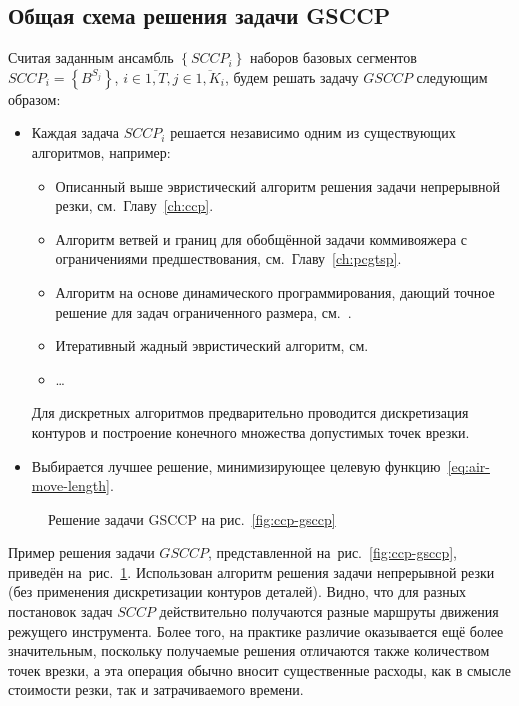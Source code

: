 \subsection{Общая схема решения задачи GSCCP}

Считая заданным ансамбль
$\left\{ SCCP_i \right\}$
наборов базовых сегментов
$SCCP_i = \left\{B^{S_j}\right\}$,
$
i \in \overline{1, T},
j \in \overline{1, K_i}
$,
будем решать задачу $GSCCP$
следующим образом:

\begin{itemize}
  \item
  Каждая задача
  $SCCP_i$
  решается независимо одним из существующих алгоритмов, например:
  \begin{itemize}
    \item
    Описанный выше эвристический алгоритм решения задачи непрерывной резки,
    см.~Главу~\ref{ch:ccp}.
    \item
    Алгоритм ветвей и границ для обобщённой задачи коммивояжера
    с ограничениями предшествования,
    см.~Главу~\ref{ch:pcgtsp}.
    \item
    Алгоритм на основе динамического программирования,
    дающий точное решение для задач ограниченного размера,
    см.~\cite{bi:RoMa}.
    \item
    Итеративный жадный эвристический алгоритм,
    см.~\cite{bi:greedy}
    \item \dots
  \end{itemize}
  Для дискретных алгоритмов предварительно проводится
  дискретизация контуров и построение конечного
  множества допустимых точек врезки.
  \item
  Выбирается лучшее решение,
  минимизирующее целевую функцию~\eqref{eq:air-move-length}.
\end{itemize}

\begin{figure}
  \centering
  \caption{Решение задачи GSCCP на рис.~\ref{fig:ccp-gsccp}}
  \label{fig:ccp-gsccp-solution}
\end{figure}

Пример решения задачи $GSCCP$,
представленной на~рис.~\ref{fig:ccp-gsccp},
приведён на~рис.~\ref{fig:ccp-gsccp-solution}.
Использован алгоритм решения задачи непрерывной резки
(без применения дискретизации контуров деталей).
Видно, что для разных постановок задач $SCCP$
действительно получаются разные маршруты
движения режущего инструмента.
Более того,
на практике различие
оказывается ещё более значительным,
поскольку получаемые решения отличаются
также количеством точек врезки,
а эта операция обычно вносит существенные расходы,
как в смысле стоимости резки,
так и затрачиваемого времени.
